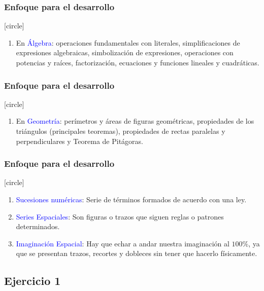 \begin{frame}
\frametitle{Enfoque para el desarrollo}
[circle]
\begin{enumerate}[<+->]
\conti
\item En \textcolor{blue}{Álgebra}: operaciones fundamentales con literales, simplificaciones de expresiones algebraicas, simbolización de expresiones, operaciones con potencias y raíces, factorización, ecuaciones y funciones lineales y cuadráticas.
\seti
\end{enumerate}
\end{frame}
\begin{frame}
\frametitle{Enfoque para el desarrollo}
[circle]
\begin{enumerate}[<+->]
\conti
\item En \textcolor{blue}{Geometría}: perímetros y áreas de figuras geométricas, propiedades de los triángulos (principales teoremas), propiedades de rectas paralelas y perpendiculares y Teorema de Pitágoras.
\seti
\end{enumerate}
\end{frame}
\begin{frame}
\frametitle{Enfoque para el desarrollo}
[circle]
\begin{enumerate}[<+->]
\conti
\item \textcolor{blue}{Sucesiones numéricas}: Serie de términos formados de acuerdo con una ley.
\item \textcolor{blue}{Series Espaciales}: Son figuras o trazos que siguen reglas o patrones determinados.
\item \textcolor{blue}{Imaginación Espacial}: Hay que echar a andar nuestra imaginación al $100\%$, ya que se presentan trazos, recortes y dobleces sin tener que hacerlo físicamente.
\end{enumerate}
\end{frame}

\subsection{Ejercicio 1}

